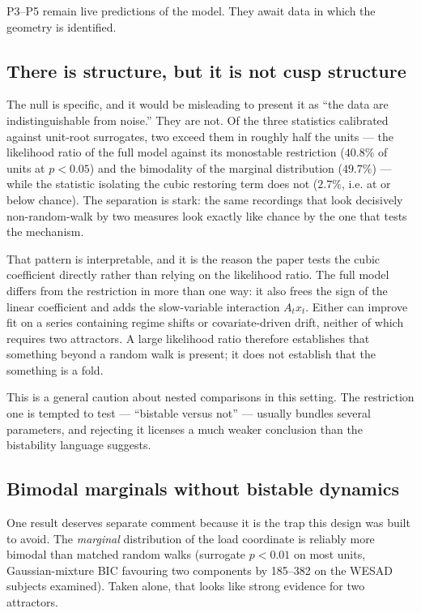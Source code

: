 \documentclass[conference]{IEEEtran}
\begin{document}
P3--P5 remain live predictions of the model. They await data in which the
geometry is identified.

\subsection{There is structure, but it is not cusp structure}
\label{sec:structure}

The null is specific, and it would be misleading to present it as ``the data
are indistinguishable from noise.'' They are not. Of the three statistics
calibrated against unit-root surrogates, two exceed them in roughly half the
units --- the likelihood ratio of the full model against its monostable
restriction ($40.8\%$ of units at $p<0.05$) and the bimodality of the marginal
distribution ($49.7\%$) --- while the statistic isolating the cubic restoring
term does not ($2.7\%$, i.e. at or below chance). The separation is stark: the same
recordings that look decisively non-random-walk by two measures look exactly
like chance by the one that tests the mechanism.

That pattern is interpretable, and it is the reason the paper tests the cubic
coefficient directly rather than relying on the likelihood ratio. The full
model differs from the restriction in more than one way: it also frees the
sign of the linear coefficient and adds the slow-variable interaction
$A_t x_t$. Either can improve fit on a series containing regime shifts or
covariate-driven drift, neither of which requires two attractors. A large
likelihood ratio therefore establishes that something beyond a random walk is
present; it does not establish that the something is a fold.

This is a general caution about nested comparisons in this setting. The
restriction one is tempted to test --- ``bistable versus not'' --- usually
bundles several parameters, and rejecting it licenses a much weaker conclusion
than the bistability language suggests.

\subsection{Bimodal marginals without bistable dynamics}
One result deserves separate comment because it is the trap this design was
built to avoid. The \emph{marginal} distribution of the load coordinate is
reliably more bimodal than matched random walks (surrogate $p<0.01$ on most
units, Gaussian-mixture BIC favouring two components by 185--382 on the WESAD
subjects examined). Taken alone, that looks like strong evidence for two
attractors.
\end{document}
